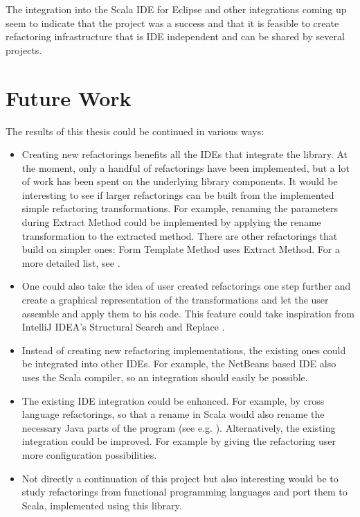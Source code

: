 \documentclass[10pt,a4paper,oneside]{scrreprt}
\begin{document}
The integration into the Scala IDE for Eclipse and other integrations coming up seem to indicate that the project was a success and that it is feasible to create refactoring infrastructure that is IDE independent and can be shared by several projects.

\section{Future Work}

The results of this thesis could be continued in various ways:

\begin{itemize}
  \item Creating new refactorings benefits all the IDEs that integrate the library. At the moment, only a handful of refactorings have been implemented, but a lot of work has been spent on the underlying library components. It would be interesting to see if larger refactorings can be built from the implemented simple refactoring transformations. For example, renaming the parameters during Extract Method could be implemented by applying the rename transformation to the extracted method. There are other refactorings that build on simpler ones: Form Template Method uses Extract Method. For a more detailed list, see \cite{Refactor}.

  \item One could also take the idea of user created refactorings one step further and create a graphical representation of the transformations and let the user assemble and apply them to his code. This feature could take inspiration from IntelliJ IDEA's Structural Search and Replace \cite{SSR}.

  \item Instead of creating new refactoring implementations, the existing ones could be integrated into other IDEs. For example, the NetBeans based IDE \cite{NetBeansJScalaIDE} also uses the Scala compiler, so an integration should easily be possible.

  \item The existing IDE integration could be enhanced. For example, by cross language refactorings, so that a rename in Scala would also rename the necessary Java parts of the program (see e.g. \cite{EclipseCrossLanguageRefactoring}). Alternatively, the existing integration could be improved. For example by giving the refactoring user more configuration possibilities.

  \item Not directly a continuation of this project but also interesting would be to study refactorings from functional programming languages and port them to Scala, implemented using this library. 
\end{itemize}
\end{document}

